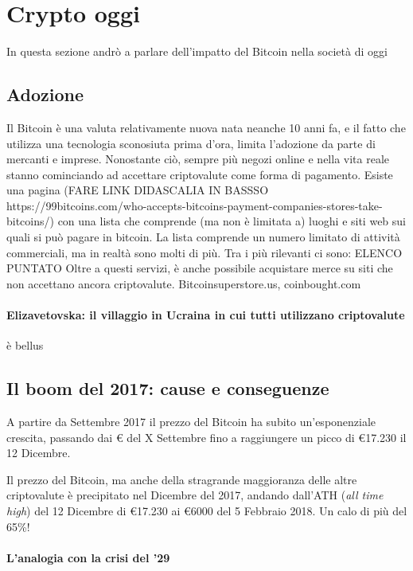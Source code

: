 \documentclass {article}
\begin{document}
{\section {Crypto oggi}


In questa sezione andrò a parlare dell'impatto del Bitcoin nella società di oggi


\subsection {Adozione}


Il Bitcoin è una valuta relativamente nuova nata neanche 10 anni fa, e il fatto che utilizza una tecnologia sconosiuta prima d'ora, limita l'adozione da parte di mercanti e imprese.
Nonostante ciò, sempre più negozi online e nella vita reale stanno cominciando ad accettare criptovalute come forma di pagamento. Esiste una pagina (FARE LINK DIDASCALIA IN BASSSO https://99bitcoins.com/who-accepts-bitcoins-payment-companies-stores-take-bitcoins/) con una lista che comprende (ma non è limitata a) luoghi e siti web sui quali si può pagare in bitcoin.
La lista comprende un numero limitato di attività commerciali, ma in realtà sono molti di più.
Tra i più rilevanti ci sono: ELENCO PUNTATO
Oltre a questi servizi, è anche possibile acquistare merce su siti che non accettano ancora criptovalute.
Bitcoinsuperstore.us, coinbought.com


\paragraph {Elizavetovska: il villaggio in Ucraina in cui tutti utilizzano criptovalute}


è bellus


\subsection {Il boom del 2017: cause e conseguenze}


A partire da Settembre 2017 il prezzo del Bitcoin ha subito un'esponenziale crescita, passando dai \euro{} del X Settembre fino a raggiungere un picco di \euro{17.230} il 12 Dicembre.

Il prezzo del Bitcoin, ma anche della stragrande maggioranza delle altre criptovalute è precipitato nel Dicembre del 2017, andando dall'ATH (\textit{all time high}) del 12 Dicembre di \euro{17.230} ai \euro{6000} del 5 Febbraio 2018. Un calo di più del 65\%!


\paragraph {L'analogia con la crisi del '29}


}
\end{document}
